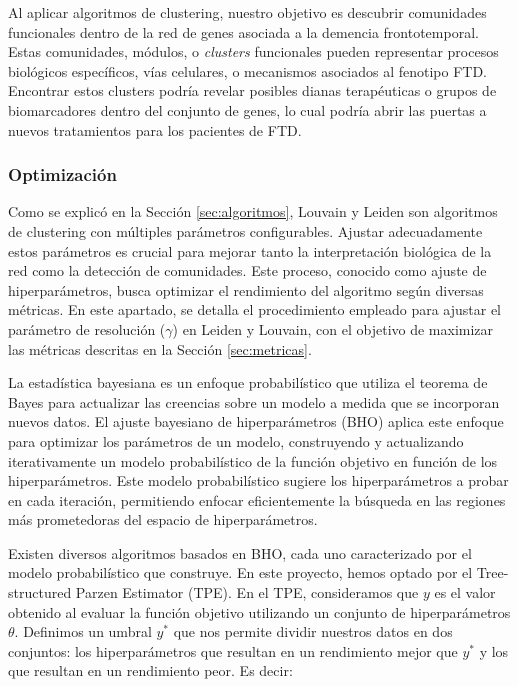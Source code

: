 Al aplicar algoritmos de clustering, nuestro objetivo es descubrir comunidades funcionales dentro de la red de genes asociada a la demencia frontotemporal. Estas comunidades, módulos, o \textit{clusters} funcionales pueden representar procesos biológicos específicos, vías celulares, o mecanismos asociados al fenotipo FTD. Encontrar estos clusters podría revelar posibles dianas terapéuticas o grupos de biomarcadores dentro del conjunto de genes, lo cual podría abrir las puertas a nuevos tratamientos para los pacientes de FTD.




\subsubsection{Optimización}

Como se explicó en la Sección \ref{sec:algoritmos}, Louvain y Leiden son algoritmos de clustering con múltiples parámetros configurables. Ajustar adecuadamente estos parámetros es crucial para mejorar tanto la interpretación biológica de la red como la detección de comunidades. Este proceso, conocido como ajuste de hiperparámetros, busca optimizar el rendimiento del algoritmo según diversas métricas. En este apartado, se detalla el procedimiento empleado para ajustar el parámetro de resolución (\(\gamma\)) en Leiden y Louvain, con el objetivo de maximizar las métricas descritas en la Sección \ref{sec:metricas}.

La estadística bayesiana es un enfoque probabilístico que utiliza el teorema de Bayes para actualizar las creencias sobre un modelo a medida que se incorporan nuevos datos. El ajuste bayesiano de hiperparámetros (BHO) aplica este enfoque para optimizar los parámetros de un modelo, construyendo y actualizando iterativamente un modelo probabilístico de la función objetivo en función de los hiperparámetros. Este modelo probabilístico sugiere los hiperparámetros a probar en cada iteración, permitiendo enfocar eficientemente la búsqueda en las regiones más prometedoras del espacio de hiperparámetros.

Existen diversos algoritmos basados en BHO, cada uno caracterizado por el modelo probabilístico que construye. En este proyecto, hemos optado por el Tree-structured Parzen Estimator (TPE). En el TPE, consideramos que \( y \) es el valor obtenido al evaluar la función objetivo utilizando un conjunto de hiperparámetros \( \theta \). Definimos un umbral \( y^* \) que nos permite dividir nuestros datos en dos conjuntos: los hiperparámetros que resultan en un rendimiento mejor que \( y^* \) y los que resultan en un rendimiento peor. Es decir:

